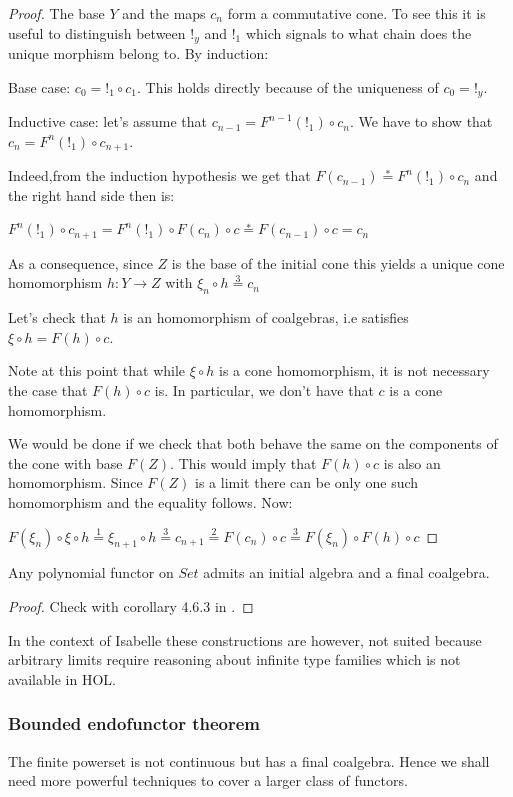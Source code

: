 \begin{proof}
	The base $Y$ and the maps $c_n$ form a commutative cone. To see this it is useful to distinguish between $!_y$ and $!_1$ which signals to what chain does the unique morphism belong to. By induction:
	
	Base case: $c_0 = !_1 \circ c_1$. This holds directly because of the uniqueness of $c_0 = !_y$. 
	
	Inductive case: let's assume that $c_{n-1} = F^{n-1}(!_1) \circ c_{n}$.  We have to show that $c_{n} = F^{n}(!_1) \circ c_{n+1}$.
	
	Indeed,from the induction hypothesis we get that $F(c_{n-1}) \stackrel{*}{=} F^n(!_1) \circ c_n$ and the right hand side then is:
	
	$F^{n}(!_1) \circ c_{n+1} = F^{n}(!_1) \circ F(c_n) \circ c \stackrel{*}{=} F(c_{n-1}) \circ c = c_n$
	
	As a consequence, since $Z$ is the base of the initial cone this yields a unique cone homomorphism $h: Y \to Z$ with $\xi_n \circ h \stackrel{3}{=} c_n$
	
	
	Let's check that $h$ is an homomorphism of coalgebras, i.e satisfies $\xi \circ h = F(h) \circ c$.
	
	Note at this point that while $\xi \circ h$ is a cone homomorphism, it is not necessary the case that $F(h) \circ c$ is. In particular, we don't have that $c$ is a cone homomorphism.
	
	We would be done if we check that both behave the same on the components of the cone with base $F(Z)$. This would imply that $F(h) \circ c$ is also an homomorphism. Since $F(Z)$ is a limit there can be only one such homomorphism and the equality follows. Now:
	
	$F(\xi_n) \circ \xi \circ h \stackrel{1}{=} \xi_{n+1} \circ h \stackrel{3}{=} c_{n+1} \stackrel{2}{=} F(c_n) \circ c \stackrel{3}{=} F(\xi_n) \circ F(h) \circ c$
	
\end{proof}

\begin{cor}
	Any polynomial functor on $Set$ admits an initial algebra and a final coalgebra.
\end{cor}
\begin{proof}
	Check with corollary 4.6.3 in \cite{jacobs2005introduction}.
\end{proof}


In the context of Isabelle these constructions are however, not suited because arbitrary limits require reasoning about infinite type families which is not available in HOL.


\subsubsection{Bounded endofunctor theorem}


The finite powerset is not continuous but has a final coalgebra. Hence we shall need
more powerful techniques to cover a larger class of functors. 




